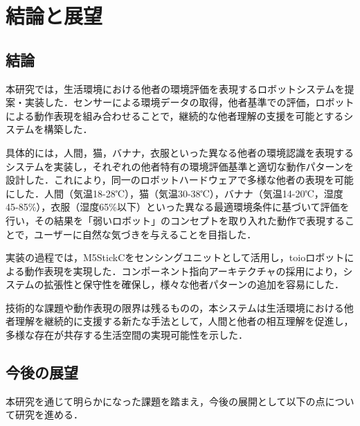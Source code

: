 \documentclass{cuxarticle}
\begin{document}
\chapter{結論と展望}

\section{結論}
本研究では，生活環境における他者の環境評価を表現するロボットシステムを提案・実装した．センサーによる環境データの取得，他者基準での評価，ロボットによる動作表現を組み合わせることで，継続的な他者理解の支援を可能とするシステムを構築した．

具体的には，人間，猫，バナナ，衣服といった異なる他者の環境認識を表現するシステムを実装し，それぞれの他者特有の環境評価基準と適切な動作パターンを設計した．これにより，同一のロボットハードウェアで多様な他者の表現を可能にした．人間（気温18-28℃），猫（気温30-38℃），バナナ（気温14-20℃，湿度45-85\%），衣服（湿度65\%以下）といった異なる最適環境条件に基づいて評価を行い，その結果を「弱いロボット」のコンセプトを取り入れた動作で表現することで，ユーザーに自然な気づきを与えることを目指した．

実装の過程では，M5StickCをセンシングユニットとして活用し，toioロボットによる動作表現を実現した．コンポーネント指向アーキテクチャの採用により，システムの拡張性と保守性を確保し，様々な他者パターンの追加を容易にした．

技術的な課題や動作表現の限界は残るものの，本システムは生活環境における他者理解を継続的に支援する新たな手法として，人間と他者の相互理解を促進し，多様な存在が共存する生活空間の実現可能性を示した．

\section{今後の展望}
本研究を通じて明らかになった課題を踏まえ，今後の展開として以下の点について研究を進める．
\end{document}
